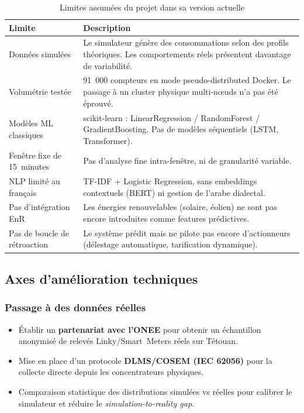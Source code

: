 \documentclass[11pt,a4paper]{article}
\begin{document}
\begin{table}[h!]
\centering
\begin{tabularx}{\textwidth}{lY}
\toprule
{}
\textbf{Limite} & \textbf{Description} \\
\midrule
Données simulées & Le simulateur génère des consommations selon des profils théoriques. Les comportements réels présentent davantage de variabilité. \\
Volumétrie testée & 91~000 compteurs en mode pseudo-distributed Docker. Le passage à un cluster physique multi-n\oe{}uds n'a pas été éprouvé. \\
Modèles ML classiques & scikit-learn : LinearRegression / RandomForest / GradientBoosting. Pas de modèles séquentiels (LSTM, Transformer). \\
Fenêtre fixe de 15~minutes & Pas d'analyse fine intra-fenêtre, ni de granularité variable. \\
NLP limité au français & TF-IDF + Logistic Regression, sans embeddings contextuels (BERT) ni gestion de l'arabe dialectal. \\
Pas d'intégration EnR & Les énergies renouvelables (solaire, éolien) ne sont pas encore introduites comme features prédictives. \\
Pas de boucle de rétroaction & Le système prédit mais ne pilote pas encore d'actionneurs (délestage automatique, tarification dynamique). \\
\bottomrule
\end{tabularx}
\caption{Limites assumées du projet dans sa version actuelle}
\end{table}

\subsection{Axes d'amélioration techniques}

\subsubsection{Passage à des données réelles}
\begin{itemize}
  \item Établir un \textbf{partenariat avec l'ONEE} pour obtenir un échantillon anonymisé de relevés Linky/Smart~Meters réels sur Tétouan.
  \item Mise en place d'un protocole \textbf{DLMS/COSEM (IEC 62056)} pour la collecte directe depuis les concentrateurs physiques.
  \item Comparaison statistique des distributions simulées vs réelles pour calibrer le simulateur et réduire le \emph{simulation-to-reality gap}.
\end{itemize}
\end{document}
